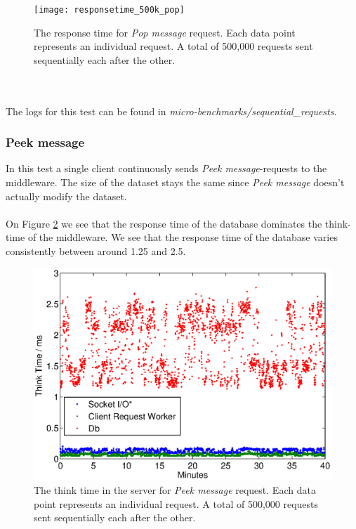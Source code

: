 \documentclass{article}
\begin{document}
                \begin{figure}[H]
                    \centering
                    \centerline{\texttt{[image: responsetime\_500k\_pop]}}
                    \caption{The response time for \textit{Pop message} request. Each data point represents an individual request. A total of 500,000 requests sent sequentially each after the other.}
                    \label{fig:responsetime_500k_pop}
                \end{figure}                
                ~\\
                \\           
                
        The logs for this test can be found in \textit{micro-benchmarks/sequential\_requests}.
            \subsubsection{Peek message}
                In this test a single client continuously sends \textit{Peek message}-requests to the middleware. The size of the dataset stays the same since \textit{Peek message} doesn't actually modify the dataset.\\
                \\
                On Figure \ref{fig:thinktime_500k_peek} we see that the response time of the database dominates the think-time of the middleware. We see that the response time of the database varies consistently between around 1.25 and 2.5.

                \begin{figure}[H]
                    \centering
                    \centerline{\includegraphics[scale=0.50]{thinktime_500k_peek}}
                    \caption{The think time in the server for \textit{Peek message} request. Each data point represents an individual request. A total of 500,000 requests sent sequentially each after the other.}
                    \label{fig:thinktime_500k_peek}
                \end{figure}
\end{document}
